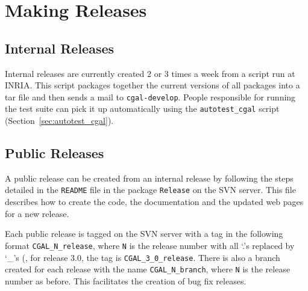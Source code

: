 \chapter{Making Releases\label{chap:releases}}

\section{Internal Releases\label{sec:internal_releases}}

Internal releases are currently created 2 or 3 times a week from a script run
at INRIA.  This script packages together the current versions of all
packages into a tar file and then sends a mail to {\tt cgal-develop}.
People responsible for running the test suite can pick it up automatically
using the {\tt autotest\_cgal} script (Section~\ref{sec:autotest_cgal}).

\section{Public Releases\label{sec:public_releases}}

A public release can be created from an internal release by following the
steps detailed in the
\texttt{README} file in the package \texttt{Release} on the SVN server.
This file describes how to create the code, the documentation and the
updated web pages for a new release.

Each public release is tagged on the SVN server with a tag in the following
format \texttt{CGAL\_N\_release}, where \texttt{N} is the release number
with all `.'s replaced by `\_'s (\eg, for release 3.0, the tag is
\texttt{CGAL\_3\_0\_release}.  There is also a branch created for
each release with the name \texttt{CGAL\_N\_branch}, where \texttt{N} is
the release number as before.  This facilitates the creation of bug fix
releases.

